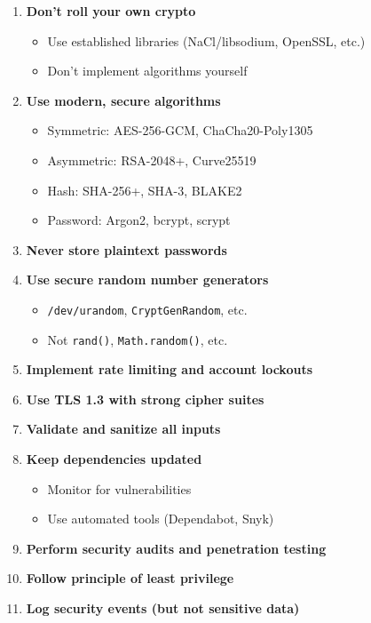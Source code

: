 \documentclass[11pt,a4paper]{report}
\begin{document}
\begin{enumerate}
\item \textbf{Don't roll your own crypto}
   \begin{itemize}
   \item Use established libraries (NaCl/libsodium, OpenSSL, etc.)
   \item Don't implement algorithms yourself
   \end{itemize}

\item \textbf{Use modern, secure algorithms}
   \begin{itemize}
   \item Symmetric: AES-256-GCM, ChaCha20-Poly1305
   \item Asymmetric: RSA-2048+, Curve25519
   \item Hash: SHA-256+, SHA-3, BLAKE2
   \item Password: Argon2, bcrypt, scrypt
   \end{itemize}

\item \textbf{Never store plaintext passwords}

\item \textbf{Use secure random number generators}
   \begin{itemize}
   \item \texttt{/dev/urandom}, \texttt{CryptGenRandom}, etc.
   \item Not \texttt{rand()}, \texttt{Math.random()}, etc.
   \end{itemize}

\item \textbf{Implement rate limiting and account lockouts}

\item \textbf{Use TLS 1.3 with strong cipher suites}

\item \textbf{Validate and sanitize all inputs}

\item \textbf{Keep dependencies updated}
   \begin{itemize}
   \item Monitor for vulnerabilities
   \item Use automated tools (Dependabot, Snyk)
   \end{itemize}

\item \textbf{Perform security audits and penetration testing}

\item \textbf{Follow principle of least privilege}

\item \textbf{Log security events (but not sensitive data)}
\end{enumerate}
\end{document}

